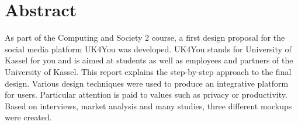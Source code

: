 \section*{Abstract}
As part of the Computing and Society 2 course, a first design proposal for the social media platform UK4You was developed.
UK4You stands for \glqq University of Kassel for you\grqq{} and is aimed at students as well as employees and partners of the University of Kassel.
This report explains the step-by-step approach to the final design.
Various design techniques were used to produce an integrative platform for users.
Particular attention is paid to values such as privacy or productivity.
Based on interviews, market analysis and many studies, three different mockups were created.
